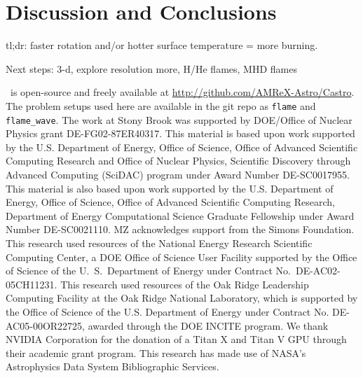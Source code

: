 \documentclass[preprint,times,tighten]{aastex63}
\newcommand{\castro}{{\sf Castro}}
\begin{document}
\section{Discussion and Conclusions}\label{Sec:conclusions}

tl;dr: faster rotation and/or hotter surface temperature = more burning.

Next steps: 3-d, explore resolution more, H/He flames, MHD flames


\acknowledgements \castro\ is open-source and freely available at
\url{http://github.com/AMReX-Astro/Castro}.  The problem setups used
here are available in the git repo as {\tt flame} and {\tt
  flame\_wave}.  The work at Stony Brook was supported by DOE/Office
of Nuclear Physics grant DE-FG02-87ER40317.  This material is based upon work supported by the
U.S. Department of Energy, Office of Science, Office of Advanced
Scientific Computing Research and Office of Nuclear Physics, Scientific
Discovery through Advanced Computing (SciDAC) program under Award
Number DE-SC0017955.  This material is also based upon work supported by the U.S. Department
of Energy, Office of Science, Office of Advanced Scientific Computing Research, Department of
Energy Computational Science Graduate Fellowship under Award Number DE-SC0021110.
MZ acknowledges support from the Simons Foundation. 
This research used resources of the National Energy
Research Scientific Computing Center, a DOE Office of Science User
Facility supported by the Office of Science of the U.~S.\ Department
of Energy under Contract No.\ DE-AC02-05CH11231.  This research used
resources of the Oak Ridge Leadership Computing Facility at the Oak
Ridge National Laboratory, which is supported by the Office of Science
of the U.S. Department of Energy under Contract No. DE-AC05-00OR22725,
awarded through the DOE INCITE program.  We thank NVIDIA Corporation
for the donation of a Titan X and Titan V GPU through their academic
grant program.  This research has made use of NASA's Astrophysics Data
System Bibliographic Services.








\end{document}
